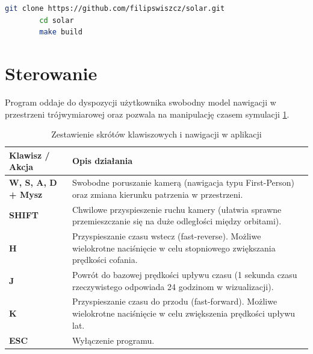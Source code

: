 \documentclass[xodstep]{wnspt}
\begin{document}
        \begin{lstlisting}[language=bash, frame=single, numbers=none]
        git clone https://github.com/filipswiszcz/solar.git
        cd solar
        make build
        \end{lstlisting}

    \newpage

    \section{Sterowanie}
    Program oddaje do dyspozycji użytkownika swobodny model nawigacji w przestrzeni trójwymiarowej oraz pozwala na manipulację czasem symulacji \ref{tab:sterowanie_dodatek}.

        \begin{table}[htpb]
            \centering
            \renewcommand{\arraystretch}{1.4}
            \begin{tabular}{|l|p{11cm}|}
                \hline
                \textbf{Klawisz / Akcja} & \textbf{Opis działania} \\
                \hline
                \textbf{W, S, A, D + Mysz} & Swobodne poruszanie kamerą (nawigacja typu First-Person) oraz zmiana kierunku patrzenia w przestrzeni. \\
                \hline
                \textbf{SHIFT} & Chwilowe przyspieszenie ruchu kamery (ułatwia sprawne przemieszczanie się na duże odległości między orbitami). \\
                \hline
                \textbf{H} & Przyspieszanie czasu wstecz (fast-reverse). Możliwe wielokrotne naciśnięcie w celu stopniowego zwiększania prędkości cofania. \\
                \hline
                \textbf{J} & Powrót do bazowej prędkości upływu czasu (1 sekunda czasu rzeczywistego odpowiada 24 godzinom w wizualizacji). \\
                \hline
                \textbf{K} & Przyspieszanie czasu do przodu (fast-forward). Możliwe wielokrotne naciśnięcie w celu zwiększenia prędkości upływu lat. \\
                \hline
                \textbf{ESC} & Wyłączenie programu. \\
                \hline
            \end{tabular}
            \caption{Zestawienie skrótów klawiszowych i nawigacji w aplikacji}
            \label{tab:sterowanie_dodatek}
        \end{table}
\end{document}
